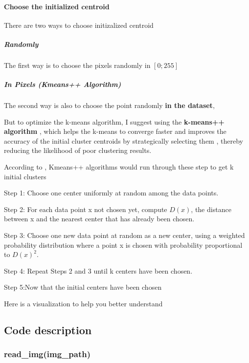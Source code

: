 \paragraph{Choose the initialized centroid}
\label{sec:init centroid}
\quad

\qquad There are two ways to choose initizalized centroid

\subparagraph{Randomly}
\qquad

\qquad The first way is to choose the pixels randomly in $[0;255]$

\subparagraph{In Pixels (Kmeans++ Algorithm) }
\qquad

\qquad The second way is also to choose the point randomly \textbf{in the dataset},

\qquad But to optimize the k-means algorithm, I suggest using the \textbf{k-means++ algorithm} , which helps the k-means to converge faster and improves the accuracy of the initial cluster centroids by strategically selecting them \cite{kmeanspluspluspaper}, thereby reducing the likelihood of poor clustering results.

\qquad \quad According to \cite{kmeanspluspluswiki}, Kmeans++ algorithms would run through these step to get k initial clusters

\qquad Step 1: Choose one center uniformly at random among the data points.

\qquad Step 2: For each data point x not chosen yet, compute $D(x)$, the distance between x and the nearest center that has already been chosen.

\qquad Step 3: Choose one new data point at random as a new center, using a weighted probability distribution where a point x is chosen with probability proportional to $D(x)^2$.

\qquad Step 4: Repeat Steps 2 and 3 until k centers have been chosen.

\qquad Step 5:Now that the initial centers have been chosen

\qquad \quad Here is a visualization to help you better understand \cite{kmeansplusplusyoutube}

\subsection{Code description}		
\subsubsection{read\_img(img\_path)}

